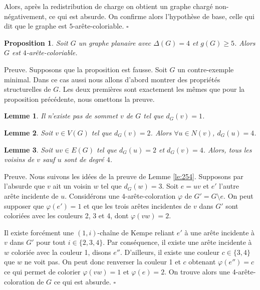 \documentclass[10pt,a4paper]{article}
\newtheorem{proposition}{Proposition}
\newtheorem{lemme}{Lemme}
\newcommand{\ep}{{\hfill $\square$}}
\begin{document}
Alors, après la redistribution de charge on obtient un graphe chargé non-négativement, ce qui est absurde. On confirme alors l'hypothèse de base, celle qui dit que le graphe est $5$-arête-coloriable.
\ep



\begin{proposition}
Soit $G$ un graphe planaire avec $\Delta(G) = 4$ et $g(G) \geq 5$. Alors $G$ est $4$-arête-coloriable.
\end{proposition}

Preuve. Supposons que la proposition est fausse. Soit $G$ un contre-exemple minimal. Dans ce cas aussi nous allons d'abord montrer des propriétés structurelles de $G$. Les deux premières sont exactement les mêmes que pour la proposition précédente, nous omettons la preuve.

\begin{lemme}
Il n'existe pas de sommet $v$ de $G$ tel que $d_G(v) = 1$.
\label{le:14}
\end{lemme}

\begin{lemme}
Soit $v \in V(G)$ tel que $d_G(v) = 2$. Alors $\forall u \in N(v)$, $d_G(u) = 4$.
\label{le:23}
\end{lemme} 


\begin{lemme}
Soit $uv \in E(G)$ tel que $d_G(u) = 2$ et $d_G(v) = 4$. Alors, tous les voisins de $v$ sauf $u$ sont de degré $4$.
\label{le:243}
\end{lemme}

Preuve. Nous suivons les idées de la preuve de Lemme \ref{le:254}.
Supposons par l'absurde que $v$ ait un voisin $w$ tel que $d_G(w) = 3$. Soit $e = uv$ et $e'$ l'autre arête incidente de $u$. Considérons une $4$-arête-coloration $\varphi$ de $G' = G \setminus e$. On peut supposer que $\varphi(e') = 1$ et que les trois arêtes incidentes de $v$ dans $G'$ sont coloriées avec les couleurs 2, 3 et 4, dont $\varphi(vw) = 2$.

Il existe forcément une $(1,i)$-chaîne de Kempe reliant $e'$ à une arête incidente à $v$ dans $G'$ pour tout $i \in \{2,3,4\}$. Par conséquence, il existe une arête incidente à $w$ coloriée avec la couleur 1, disons $e''$. D'ailleurs, il existe une couleur $c\in \{3,4\}$ que $w$ ne voit pas. On peut donc renverser la couleur 1 et $c$ obtenant $\varphi(e'') = c$ ce qui permet de colorier $\varphi(vw) = 1$ et $\varphi(e) = 2$. On trouve alors une 4-arête-coloration de $G$ ce qui est absurde.
\ep
\end{document}
